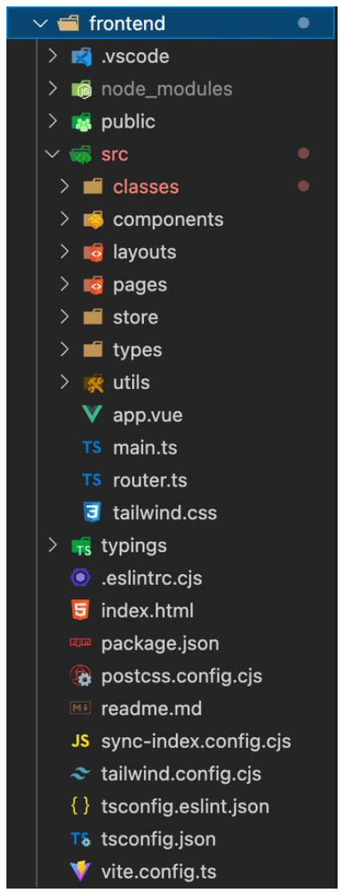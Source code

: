 \documentclass[notitlepage, 12pt]{report}
\begin{document}
\begin{minipage}{1\textwidth}
	\begin{minipage}{0.29\textwidth}
		\includegraphics[width=1\textwidth]{frontend-files.png}

\end{minipage}
\end{minipage}
\end{document}
